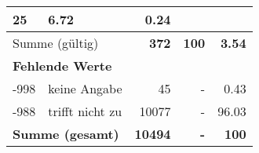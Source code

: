 \begin{longtable}{lXrrr}
       \num{25} &
       \num[round-mode=places,round-precision=2]{6,72} &
         \num[round-mode=places,round-precision=2]{0,24} \\
     \midrule
     \multicolumn{2}{l}{Summe (gültig)} &
       \textbf{\num{372}} &
     \textbf{100} &
       \textbf{\num[round-mode=places,round-precision=2]{3,54}} \\
     \multicolumn{5}{l}{\textbf{Fehlende Werte}}\\
       -998 &
       keine Angabe &
         \num{45} &
        - &
         \num[round-mode=places,round-precision=2]{0,43} \\
       -988 &
       trifft nicht zu &
         \num{10077} &
        - &
         \num[round-mode=places,round-precision=2]{96,03} \\
     \midrule
     \multicolumn{2}{l}{\textbf{Summe (gesamt)}} &
          \textbf{\num{10494}} &
        \textbf{-} &
        \textbf{100} \\
     \bottomrule
     \end{longtable}
     
